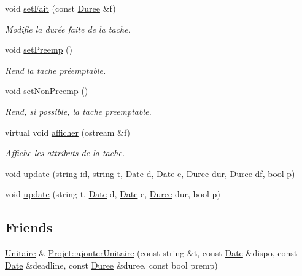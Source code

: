 \begin{DoxyCompactItemize}
void \hyperlink{class_unitaire_ad9ef9d9bb2b47520c3c609d822364964}{set\+Fait} (const \hyperlink{class_t_i_m_e_1_1_duree}{Duree} \&f)
\begin{DoxyCompactList}\small\item\em Modifie la durée faite de la tache. \end{DoxyCompactList}\item 
void \hyperlink{class_unitaire_aa4893599f98385c26884441655331bc2}{set\+Preemp} ()
\begin{DoxyCompactList}\small\item\em Rend la tache préemptable. \end{DoxyCompactList}\item 
void \hyperlink{class_unitaire_a8bb9a65dc5b0d03a44353edfae06580d}{set\+Non\+Preemp} ()
\begin{DoxyCompactList}\small\item\em Rend, si possible, la tache preemptable. \end{DoxyCompactList}\item 
virtual void \hyperlink{class_unitaire_a98bd645b84e0bd2f378e13774324f7b7}{afficher} (ostream \&f)
\begin{DoxyCompactList}\small\item\em Affiche les attributs de la tache. \end{DoxyCompactList}\item 
void \hyperlink{class_unitaire_a965c3d4d8ba7864ae28a24a5d514dec5}{update} (string id, string t, \hyperlink{class_t_i_m_e_1_1_date}{Date} d, \hyperlink{class_t_i_m_e_1_1_date}{Date} e, \hyperlink{class_t_i_m_e_1_1_duree}{Duree} dur, \hyperlink{class_t_i_m_e_1_1_duree}{Duree} df, bool p)
\item 
void \hyperlink{class_unitaire_a2f189cf8c1bc7d22b805e6bfd1aa0bd7}{update} (string t, \hyperlink{class_t_i_m_e_1_1_date}{Date} d, \hyperlink{class_t_i_m_e_1_1_date}{Date} e, \hyperlink{class_t_i_m_e_1_1_duree}{Duree} dur, bool p)
\end{DoxyCompactItemize}
\subsection*{Friends}
\begin{DoxyCompactItemize}
\item 
\hyperlink{class_unitaire}{Unitaire} \& \hyperlink{class_unitaire_af32ab372e13abfb17b253ade6390cfd3}{Projet\+::ajouter\+Unitaire} (const string \&t, const \hyperlink{class_t_i_m_e_1_1_date}{Date} \&dispo, const \hyperlink{class_t_i_m_e_1_1_date}{Date} \&deadline, const \hyperlink{class_t_i_m_e_1_1_duree}{Duree} \&duree, const bool premp)
\end{DoxyCompactItemize}


